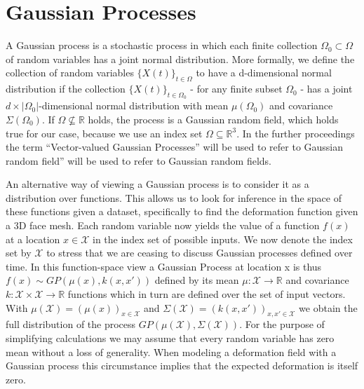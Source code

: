 \section{Gaussian Processes}

A Gaussian process is a stochastic process in which each finite collection $\Omega_{0} \subset \Omega$ of random variables has a joint normal distribution. More formally, we define the collection of random variables $\{X(t)\}_{t \in \Omega}$ to have a d-dimensional normal distribution if the collection $\{X(t)\}_{t \in \Omega_{0}}$ - for any finite subset $\Omega_{0}$ - has a joint $d\times \left| \Omega_{0} \right|$-dimensional normal distribution with mean
$\mu (\Omega_{0})$ and covariance $\Sigma (\Omega_{0})$.  
If $\Omega \not\subseteq \mathbb{R}$ holds, the process is a Gaussian random field, which holds true for our case, because we use an index set $\Omega \subseteq \mathbb{R}^{3}$. In the further proceedings the term ``Vector-valued Gaussian Processes'' will be used to refer to Gaussian random field'' will be used to refer to Gaussian random fields.

An alternative way of viewing a Gaussian process is to consider it as a distribution over functions. This allows us to look for inference in the space of these functions given a dataset, specifically to find the deformation function given a 3D face mesh. Each random variable now yields the value of a function $f(x)$ at a location $x \in \mathcal{X}$ in the index set of possible inputs. We now denote the index set by $\mathcal{X}$ to stress that we are ceasing to discuss
Gaussian processes defined over time. In this function-space view a Gaussian Process at location x is thus $f(x) \sim GP(\mu(x), k(x,x'))$ defined by its mean $\mu:\mathcal{X}
\rightarrow \mathbb{R}$ and covariance $k:\mathcal{X} \times \mathcal{X} \rightarrow \mathbb{R}$ functions which in turn are defined over the set of input vectors. With $\mu(\mathcal{X})=(\mu(x))_{x \in \mathcal{X}}$ and $\Sigma(\mathcal{X})=(k(x,x'))_{x,x' \in \mathcal{X}}$ we obtain the full distribution of the process $GP(\mu(\mathcal{X}), \Sigma(\mathcal{X}))$. For the purpose of simplifying calculations we may assume that every random variable has zero mean without a loss of generality. When modeling a deformation field with a Gaussian process this circumstance implies that the expected deformation is itself zero. 

